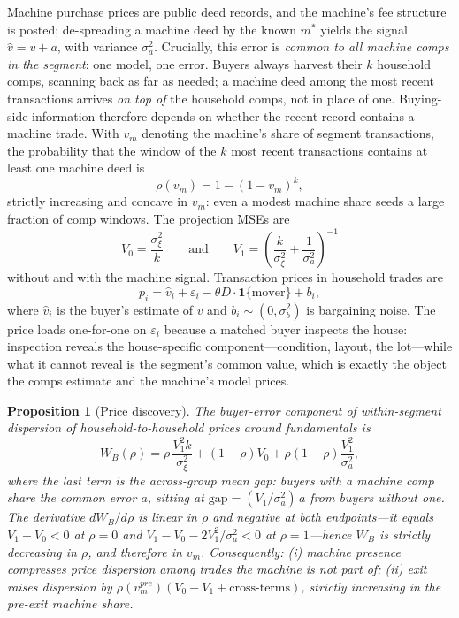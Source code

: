 \documentclass[12pt, letterpaper]{article}
\newtheorem{proposition}{Proposition}
\theoremstyle{remark}
\newcommand{\ind}[1]{\mathbf{1}\{#1\}}
\begin{document}
Machine purchase prices are public deed records, and the machine's fee structure is posted; de-spreading a machine deed by the known $m^*$ yields the signal $\hat v = v + a$, with variance $\sigma_a^2$. Crucially, this error is \emph{common to all machine comps in the segment}: one model, one error. Buyers always harvest their $k$ household comps, scanning back as far as needed; a machine deed among the most recent transactions arrives \emph{on top of} the household comps, not in place of one. Buying-side information therefore depends on whether the recent record contains a machine trade. With $v_m$ denoting the machine's share of segment transactions, the probability that the window of the $k$ most recent transactions contains at least one machine deed is
\begin{equation}
\rho(v_m) = 1 - (1 - v_m)^k,
\label{eq:rho}
\end{equation}
strictly increasing and concave in $v_m$: even a modest machine share seeds a large fraction of comp windows. The projection MSEs are
\begin{equation}
V_0 = \frac{\sigma_\xi^2}{k}
\qquad \text{and} \qquad
V_1 = \left( \frac{k}{\sigma_\xi^2} + \frac{1}{\sigma_a^2} \right)^{-1}
\label{eq:mses}
\end{equation}
without and with the machine signal. Transaction prices in household trades are
\begin{equation}
p_i = \hat v_i + \varepsilon_i - \theta D \cdot \ind{\text{mover}} + b_i,
\label{eq:price}
\end{equation}
where $\hat v_i$ is the buyer's estimate of $v$ and $b_i \sim (0, \sigma_b^2)$ is bargaining noise. The price loads one-for-one on $\varepsilon_i$ because a matched buyer inspects the house: inspection reveals the house-specific component---condition, layout, the lot---while what it cannot reveal is the segment's common value, which is exactly the object the comps estimate and the machine's model prices.

\begin{proposition}[Price discovery]\label{prop:discovery}
The buyer-error component of within-segment dispersion of household-to-household prices around fundamentals is
\begin{equation}
W_B(\rho) = \rho \, \frac{V_1^2 k}{\sigma_\xi^2} + (1 - \rho) V_0 + \rho (1 - \rho) \frac{V_1^2}{\sigma_a^2},
\label{eq:WB}
\end{equation}
where the last term is the across-group mean gap: buyers with a machine comp share the common error $a$, sitting at $\mathrm{gap} = (V_1/\sigma_a^2)\, a$ from buyers without one. The derivative $dW_B/d\rho$ is linear in $\rho$ and negative at both endpoints---it equals $V_1 - V_0 < 0$ at $\rho = 0$ and $V_1 - V_0 - 2V_1^2/\sigma_a^2 < 0$ at $\rho = 1$---hence $W_B$ is strictly decreasing in $\rho$, and therefore in $v_m$. Consequently:
(i) machine presence compresses price dispersion among trades the machine is \emph{not} part of;
(ii) exit raises dispersion by $\rho(v_m^{pre}) \left( V_0 - V_1 + \text{cross-terms} \right)$, strictly increasing in the pre-exit machine share.
\end{proposition}
\end{document}

